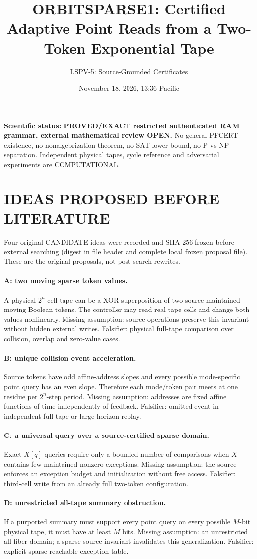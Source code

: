 \documentclass[11pt]{article}
\title{ORBITSPARSE1: Certified Adaptive Point Reads from a Two-Token Exponential Tape}
\author{LSPV-5: Source-Grounded Certificates}
\date{November 18, 2026, 13:36 Pacific}
\begin{document}
\maketitle
\noindent\textbf{Scientific status: PROVED/EXACT restricted authenticated RAM grammar, external mathematical review OPEN.} No general PFCERT existence, no nonalgebrization theorem, no SAT lower bound, no P-vs-NP separation. Independent physical tapes, cycle reference and adversarial experiments are COMPUTATIONAL.
\section{IDEAS PROPOSED BEFORE LITERATURE}
Four original CANDIDATE ideas were recorded and SHA-256 frozen before external searching (digest in file header and complete local frozen proposal file). These are the original proposals, not post-search rewrites.
\paragraph{A: two moving sparse token values.} A physical $2^n$-cell tape can be a XOR superposition of two source-maintained moving Boolean tokens. The controller may read real tape cells and change both values nonlinearly. Missing assumption: source operations preserve this invariant without hidden external writes. Falsifier: physical full-tape comparison over collision, overlap and zero-value cases.
\paragraph{B: unique collision event acceleration.} Source tokens have odd affine-address slopes and every possible mode-specific point query has an even slope. Therefore each mode/token pair meets at one residue per $2^n$-step period. Missing assumption: addresses are fixed affine functions of time independently of feedback. Falsifier: omitted event in independent full-tape or large-horizon replay.
\paragraph{C: a universal query over a source-certified sparse domain.} Exact $X[q]$ queries require only a bounded number of comparisons when $X$ contains few maintained nonzero exceptions. Missing assumption: the source enforces an exception budget and initialization without free access. Falsifier: third-cell write from an already full two-token configuration.
\paragraph{D: unrestricted all-tape summary obstruction.} If a purported summary must support every point query on every possible $M$-bit physical tape, it must have at least $M$ bits. Missing assumption: an unrestricted all-fiber domain; a sparse source invariant invalidates this generalization. Falsifier: explicit sparse-reachable exception table.
\end{document}
